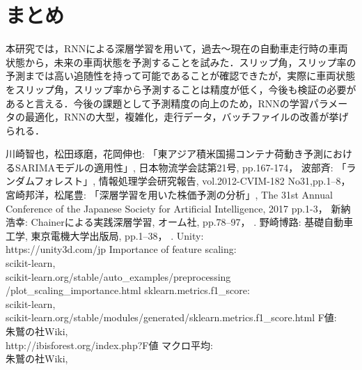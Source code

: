 \documentclass[twocolumn]{jsarticle}
\begin{document}
\section{まとめ}
本研究では，RNNによる深層学習を用いて，過去～現在の自動車走行時の車両状態から，未来の車両状態を予測することを試みた．スリップ角，スリップ率の予測までは高い追随性を持って可能であることが確認できたが，実際に車両状態をスリップ角，スリップ率から予測することは精度が低く，今後も検証の必要があると言える．今後の課題として予測精度の向上のため，RNNの学習パラメータの最適化，RNNの大型，複雑化，走行データ，バッチファイルの改善が挙げられる．

\begin{thebibliography}{99}
%
川崎智也，松田琢磨，花岡伸也:
  \newblock 「東アジア積米国揚コンテナ荷動き予測におけるSARIMAモデルの適用性」,
  \newblock 日本物流学会誌第21号,
  \newblock pp.167-174，
%
波部斉:
  \newblock 「ランダムフォレスト」,
  \newblock 情報処理学会研究報告,
  \newblock vol.2012-CVIM-182 No31,pp.1--8，
%
宮崎邦洋，松尾豊:
  \newblock 「深層学習を用いた株価予測の分析」,
  \newblock The 31st Annual Conference of the Japanese Society for Artificial Intelligence, 2017
  \newblock pp.1-3，
%
新納浩幸:
  \newblock Chainerによる実践深層学習,
  \newblock オーム社,
  \newblock pp.78--97，
  .
%
野崎博路:
  \newblock 基礎自動車工学,
  \newblock 東京電機大学出版局,
  \newblock pp.1--38，
  .
%
 Unity:\\
  \newblock https://unity3d.com/jp
%
 Importance of feature scaling:\\
  \newblock scikit-learn,\\
  \newblock scikit-learn.org/stable/auto\_examples/preprocessing\\
  \newblock /plot\_scaling\_importance.html
%
sklearn.metrics.f1\_score:\\
  \newblock scikit-learn,\\
  \newblock scikit-learn.org/stable/modules/generated/sklearn.metrics.f1\_score.html
%
F値:\\
  \newblock 朱鷲の社Wiki,\\
  \newblock http://ibisforest.org/index.php?F値
%
マクロ平均:\\
  \newblock 朱鷲の社Wiki,\\

\end{thebibliography}
\end{document}
